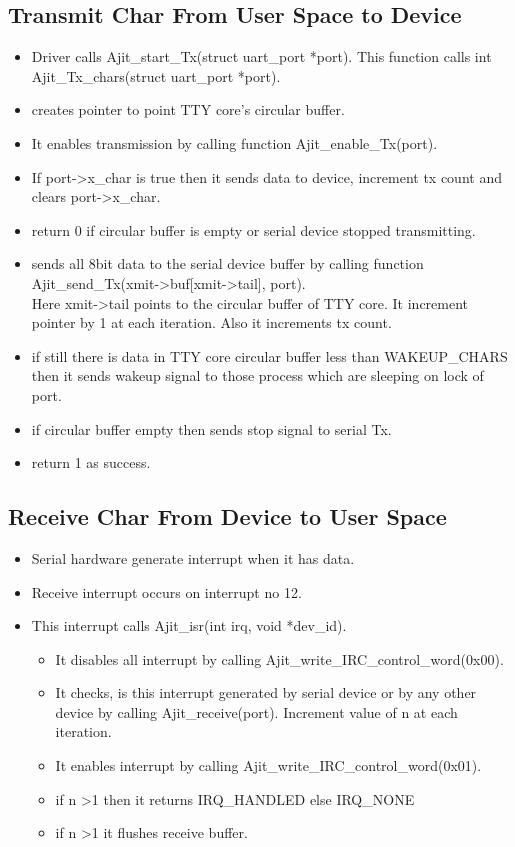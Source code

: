 \documentclass[12pt,a4paper]{article}
\begin{document}
\subsection{Transmit Char From User Space to Device}
\begin{itemize}
\item Driver calls Ajit\_start\_Tx(struct uart\_port *port). This function calls int Ajit\_Tx\_chars(struct uart\_port *port).
\item creates pointer to point TTY core's circular buffer.
\item It enables transmission by calling function Ajit\_enable\_Tx(port).
\item If port-\textgreater x\_char is true then it sends data to device, increment tx count and clears port-\textgreater x\_char. 
\item return 0 if circular buffer is empty or serial device stopped transmitting.
\item sends all 8bit data to the serial device buffer by calling function Ajit\_send\_Tx(xmit-\textgreater buf[xmit-\textgreater tail], port).\\
Here xmit-\textgreater tail points to the circular buffer of TTY core. It increment pointer by 1 at each iteration. Also it increments tx count.
\item if still there is data in TTY core circular buffer less than WAKEUP\_CHARS then it sends wakeup signal to those process which are sleeping on lock of port.
\item if circular buffer empty then sends stop signal to serial Tx.
\item return 1 as success. 
\end{itemize}
\subsection{Receive Char From Device to User Space}
\begin{itemize}
\item Serial hardware generate interrupt when it has data.
\item Receive interrupt occurs on interrupt no 12.
\item This interrupt calls Ajit\_isr(int irq, void *dev\_id).
\begin{itemize}
\item It disables all interrupt by calling Ajit\_write\_IRC\_control\_word(0x00).
\item It checks, is this interrupt generated by serial device or by any other device by calling Ajit\_receive(port). Increment value of n at each iteration.
\item It enables interrupt by calling Ajit\_write\_IRC\_control\_word(0x01).
\item if n \textgreater 1 then it returns IRQ\_HANDLED else IRQ\_NONE
\item if n \textgreater 1 it flushes receive buffer.
\end{itemize}
\end{itemize}
\end{document}

